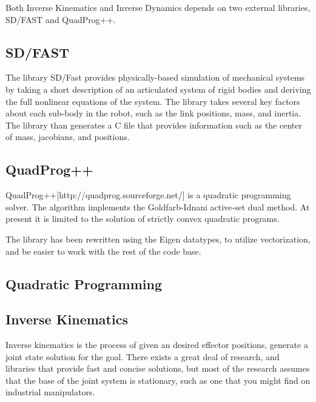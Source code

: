 \documentclass{article}
\begin{document}
Both Inverse Kinematics and Inverse Dynamics depends on two external libraries, SD/FAST and QuadProg++. 

\subsection{SD/FAST}
The library SD/Fast provides physically-based simulation of mechanical systems by taking a short description of an articulated system of rigid bodies and deriving the full nonlinear equations of the system. \cite{sdfast} The library takes several key factors about each sub-body in the robot, such as the link positions, mass, and inertia. The library than generates a C file that provides information such as the center of mass, jacobians, and positions. 

\subsection{QuadProg++}
QuadProg++[http://quadprog.sourceforge.net/] is a quadratic programming solver. The algorithm implements the Goldfarb-Idnani active-set dual method. At present it is limited to the solution of strictly convex quadratic programs. \cite{quadprog}

The library has been rewritten using the Eigen datatypes, to utilize vectorization, and be easier to work with the rest of the code base. 

\subsection{Quadratic Programming}



\subsection{Inverse Kinematics}


Inverse kinematics is the process of given an desired effector positions, generate a joint state solution for the goal. There exists a great deal of research, and libraries that provide fast and concise solutions, but most of the research assumes that the base of the joint system is stationary, such as one that you might find on industrial manipulators. 
\end{document}
